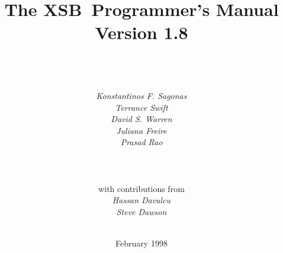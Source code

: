 \documentclass[11pt]{report}
\newcommand{\ourprolog}{XSB}
\newcommand{\version}{Version 1.8}
\begin{document}
\title{\bf The \ourprolog\ Programmer's Manual \\ \version}

\author{{\epsfxsize=230pt }\\
	\ \\ \ \\
	{\em Konstantinos F. Sagonas} \\
	{\em Terrance Swift} \\
	{\em David S. Warren} \\ 
	{\em Juliana Freire} \\
	{\em Prasad Rao} \\
	\ \\ \\ \\
	{\normalsize with contributions from} \\
	{\em Hassan Davulcu} \\
	{\em Steve Dawson} \\
	\ \\
} 

\date{February 1998}

\maketitle



\thispagestyle{empty}

\newpage
\thispagestyle{empty}
%

\tableofcontents
\newpage	%
  

















%

\appendix




%




\end{document}
